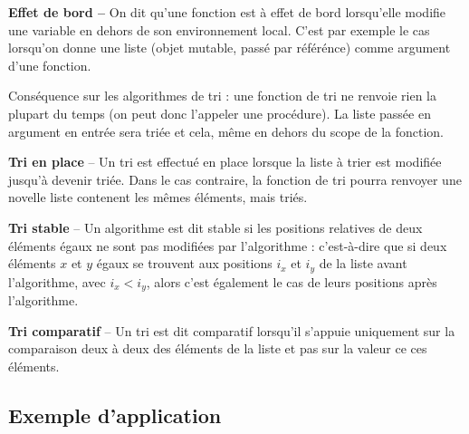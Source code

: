 \begin{defi}\textbf{Effet de bord -- } On dit qu'une fonction est à effet de bord lorsqu'elle modifie une variable  en dehors de son environnement local. C'est par exemple le cas lorsqu'on donne une liste (objet mutable, passé par référénce) comme argument d'une fonction.

Conséquence sur les algorithmes de tri : une fonction de tri ne renvoie rien la plupart du temps (on peut donc l'appeler une procédure). La liste passée en argument en entrée sera triée et cela, même en dehors du scope de la fonction. 
\end{defi}


\begin{defi}\textbf{Tri en place} -- 
Un tri est effectué en place lorsque la liste à trier est modifiée jusqu'à devenir triée. Dans le cas contraire, la fonction de tri pourra renvoyer une novelle liste contenent les mêmes éléments, mais triés. 
\end{defi}


\begin{defi}\textbf{Tri stable} -- 
Un algorithme est dit stable si les positions relatives de deux éléments égaux ne sont pas
modifiées par l'algorithme : c'est-à-dire que si deux éléments $x$ et $y$ égaux se trouvent aux positions $i_x$ et $i_y$ de
la liste avant l'algorithme, avec $i_x < i_y$, alors c'est également le cas de leurs positions après l'algorithme.
\end{defi}

\begin{defi}\textbf{Tri comparatif} --
Un tri est dit comparatif lorsqu'il s'appuie uniquement sur la comparaison deux à deux des éléments de la liste et pas sur la valeur ce ces éléments.
\end{defi}

\subsection{Exemple d'application}

